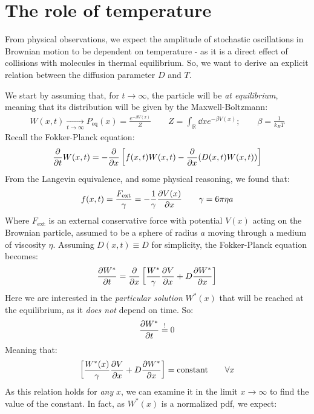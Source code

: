 \documentclass[../template.tex]{subfiles}
\begin{document}
\section{The role of temperature}
From physical observations, we expect the amplitude of stochastic oscillations in Brownian motion to be dependent on temperature - as it is a direct effect of collisions with molecules in thermal equilibrium. So, we want to derive an explicit relation between the diffusion parameter $D$ and $T$.

We start by assuming that, for $t \to \infty$, the particle will be \textit{at equilibrium}, meaning that its distribution will be given by the Maxwell-Boltzmann: 
\begin{align*}
    W(x,t)  \xrightarrow[t \to \infty]{}  P_{\mathrm{eq} }(x) = \frac{e^{- \beta V(x)}}{Z} \qquad Z = \int_{\mathbb{R}} \dd{x} e^{- \beta V(x)}; \qquad \beta = \frac{1}{k_B T} 
\end{align*}
Recall the Fokker-Planck equation:
\begin{align*}
    \pdv{t} W(x,t) = - \pdv{x} \left[f(x,t) W(x,t) - \pdv{x} (D(x,t) W(x,t))\right]
\end{align*}
From the Langevin equivalence, and some physical reasoning, we found that:
\begin{align*}
    f(x,t) = \frac{F_{\mathrm{ext}}}{\gamma} = -\frac{1}{\gamma} \pdv{V(x)}{x} \qquad \gamma = 6 \pi \eta a  
\end{align*}
Where $F_{\mathrm{ext}}$ is an external conservative force with potential $V(x)$ acting on the Brownian particle, assumed to be a sphere of radius $a$ moving through a medium of viscosity $\eta$. Assuming $D(x,t) \equiv D$ for simplicity, the Fokker-Planck equation becomes:
\begin{align*}
    \pdv{W^*}{t} = \pdv{x} \left[\frac{W^*}{\gamma} \pdv{V}{x}  + D \pdv{W^*}{x} \right]
\end{align*}
Here we are interested in the \textit{particular solution} $W^*(x)$ that will be reached at the equilibrium, as it \textit{does not} depend on time. So:
\begin{align*}
    \pdv{W^*}{t} \overset{!}{=}  0 
\end{align*}  
Meaning that:
\begin{align} \label{eqn:T1}
    \left[\frac{W^*(x)}{\gamma} \pdv{V}{x} (x) + D \pdv{W^*}{x} (x) \right] = \mathrm{constant}  \qquad \forall x
\end{align}
As this relation holds for \textit{any} $x$, we can examine it in the limit $x \to \infty$ to find the value of the constant. In fact, as $W^*(x)$ is a normalized pdf, we expect:
\end{document}
